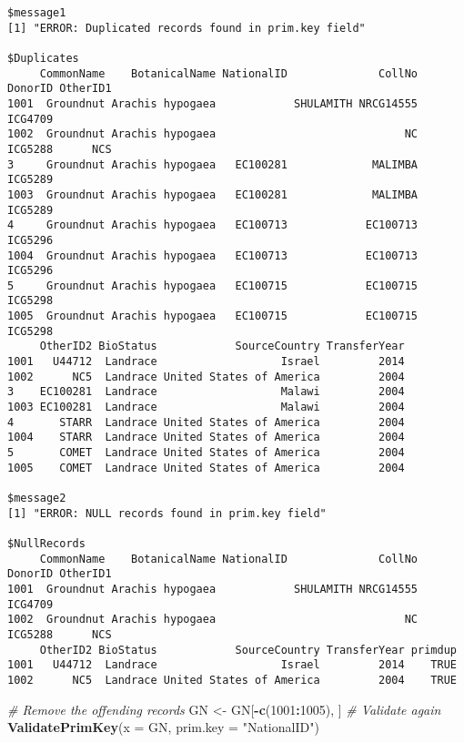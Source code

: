 \documentclass[
]{article}
\newenvironment{Shaded}{\begin{snugshade}}{\end{snugshade}}
\newcommand{\CommentTok}[1]{\textcolor[rgb]{0.56,0.35,0.01}{\textit{#1}}}
\newcommand{\DataTypeTok}[1]{\textcolor[rgb]{0.13,0.29,0.53}{#1}}
\newcommand{\DecValTok}[1]{\textcolor[rgb]{0.00,0.00,0.81}{#1}}
\newcommand{\KeywordTok}[1]{\textcolor[rgb]{0.13,0.29,0.53}{\textbf{#1}}}
\newcommand{\NormalTok}[1]{#1}
\newcommand{\OperatorTok}[1]{\textcolor[rgb]{0.81,0.36,0.00}{\textbf{#1}}}
\newcommand{\StringTok}[1]{\textcolor[rgb]{0.31,0.60,0.02}{#1}}
\begin{document}
\begin{verbatim}
$message1
[1] "ERROR: Duplicated records found in prim.key field"

$Duplicates
     CommonName    BotanicalName NationalID              CollNo DonorID OtherID1
1001  Groundnut Arachis hypogaea            SHULAMITH NRCG14555 ICG4709         
1002  Groundnut Arachis hypogaea                             NC ICG5288      NCS
3     Groundnut Arachis hypogaea   EC100281             MALIMBA ICG5289         
1003  Groundnut Arachis hypogaea   EC100281             MALIMBA ICG5289         
4     Groundnut Arachis hypogaea   EC100713            EC100713 ICG5296         
1004  Groundnut Arachis hypogaea   EC100713            EC100713 ICG5296         
5     Groundnut Arachis hypogaea   EC100715            EC100715 ICG5298         
1005  Groundnut Arachis hypogaea   EC100715            EC100715 ICG5298         
     OtherID2 BioStatus            SourceCountry TransferYear
1001   U44712  Landrace                   Israel         2014
1002      NC5  Landrace United States of America         2004
3    EC100281  Landrace                   Malawi         2004
1003 EC100281  Landrace                   Malawi         2004
4       STARR  Landrace United States of America         2004
1004    STARR  Landrace United States of America         2004
5       COMET  Landrace United States of America         2004
1005    COMET  Landrace United States of America         2004

$message2
[1] "ERROR: NULL records found in prim.key field"

$NullRecords
     CommonName    BotanicalName NationalID              CollNo DonorID OtherID1
1001  Groundnut Arachis hypogaea            SHULAMITH NRCG14555 ICG4709         
1002  Groundnut Arachis hypogaea                             NC ICG5288      NCS
     OtherID2 BioStatus            SourceCountry TransferYear primdup
1001   U44712  Landrace                   Israel         2014    TRUE
1002      NC5  Landrace United States of America         2004    TRUE
\end{verbatim}

\begin{Shaded}
\begin{Highlighting}[]
\CommentTok{# Remove the offending records}
\NormalTok{GN <-}\StringTok{ }\NormalTok{GN[}\OperatorTok{-}\KeywordTok{c}\NormalTok{(}\DecValTok{1001}\OperatorTok{:}\DecValTok{1005}\NormalTok{), ]}
\CommentTok{# Validate again}
\KeywordTok{ValidatePrimKey}\NormalTok{(}\DataTypeTok{x =}\NormalTok{ GN, }\DataTypeTok{prim.key =} \StringTok{"NationalID"}\NormalTok{)}
\end{Highlighting}
\end{Shaded}
\end{document}
